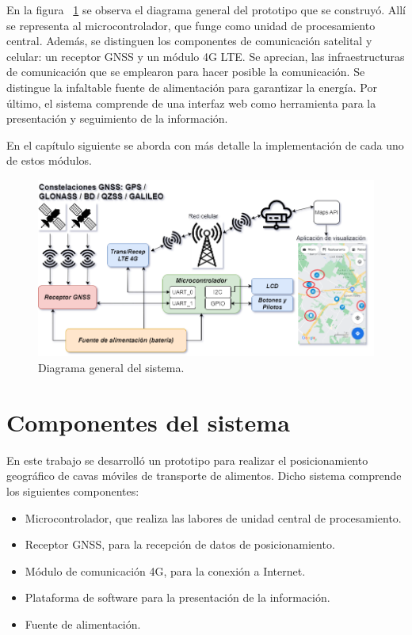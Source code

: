 En la figura ~\ref{fig:diagrama_general} se observa el diagrama general del prototipo que se construyó. Allí se representa al microcontrolador, que funge como unidad de procesamiento central. Además, se distinguen los componentes de comunicación satelital y celular: un receptor GNSS y un módulo 4G LTE. Se aprecian, las infraestructuras de comunicación que se emplearon para hacer posible la comunicación. Se distingue la infaltable fuente de alimentación para garantizar la energía. Por último, el sistema comprende de una interfaz web como herramienta para la presentación y seguimiento de la información. 

En el capítulo siguiente se aborda con más detalle la implementación de cada uno de estos módulos.


\vspace{1cm}

\begin{figure}[htbp]
	\centering
	\includegraphics[width=1\textwidth]{./Figures/diagrama_general.png}
	\caption{Diagrama general del sistema.}
	\label{fig:diagrama_general}
\end{figure}



\section{Componentes del sistema}
\label{sec:Componentes_sistema}

En este trabajo se desarrolló un prototipo para realizar el posicionamiento geográfico de cavas móviles de transporte de alimentos. Dicho sistema comprende los siguientes componentes:

\begin{itemize}
    \item Microcontrolador, que realiza las labores de unidad central de procesamiento.
    \item Receptor GNSS, para la recepción de datos de posicionamiento.
    \item Módulo de comunicación 4G, para la conexión a Internet.
    \item Plataforma de software para la presentación de la información. 
    \item Fuente de alimentación.
\end{itemize}

